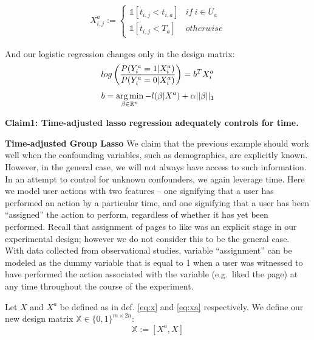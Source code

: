 \documentclass[]{article}
\DeclareMathOperator*{\argmin}{arg\,min}
\begin{document}
\begin{align} 
        X_{i,j}^a := \begin{cases} \label{eq:xa}
        \mathbb{1}[t_{i,j} < t_{i,a}] & if \ i \in U_a\\
        \mathbb{1}[t_{i,j} < T_a] & otherwise
        \end{cases}
\end{align}

And our logistic regression changes only in the design matrix:
\begin{equation}
log \left( \frac{P(Y^a_i = 1 | X^a_i)}{P(Y^a_i = 0 | X^a_i)} \right) = b^T X^a_i\\
\end{equation} \begin{equation}
b = \argmin_{\beta \in \mathbb{R}^{n}} - l(\beta | X^a)  + \alpha||\beta||_1\\
\end{equation}

\textbf{Claim1: Time-adjusted lasso regression adequately controls for time.}

\textbf{Time-adjusted Group Lasso} We claim that the previous example
should work well when the confounding variables, such as demographics,
are explicitly known. However, in the general case, we will not always
have access to such information. In an attempt to control for unknown
confounders, we again leverage time. Here we model user actions with two
features -- one signifying that a user has performed an action by a
particular time, and one signifying that a user has been ``assigned''
the action to perform, regardless of whether it has yet been performed.
Recall that assignment of pages to like was an explicit stage in our
experimental design; however we do not consider this to be the general
case. With data collected from observational studies, variable
``assignment'' can be modeled as the dummy variable that is equal to 1
when a user was witnessed to have performed the action associated with
the variable (e.g.~liked the page) at any time throughout the course of
the experiment.

Let \(X\) and \(X^a\) be defined as in def. \ref{eq:x} and \ref{eq:xa}
respectively. We define our new design matrix
\(\mathbb{X} \in \{0,1\}^{m \times 2n}\): \begin{equation}
        \mathbb{X} := \left[ X^a, X \right]
\end{equation}
\end{document}
